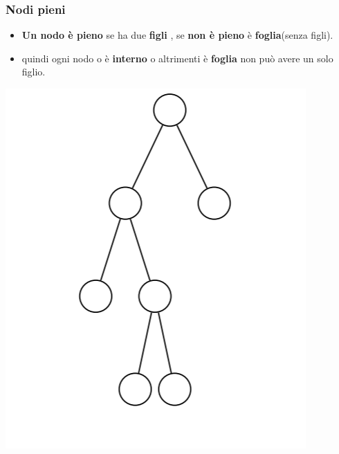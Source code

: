 \subsubsection{Nodi pieni}
\begin{itemize}
    \item   \textbf{Un nodo è pieno} se ha due \textbf{figli} , se \textbf{non è pieno} è \textbf{foglia}(senza figli).
    \item  quindi ogni nodo o è \textbf{interno} o altrimenti è \textbf{foglia} non può avere un solo figlio.
\end{itemize}
\begin{center}
    \includegraphics[scale = 0.3]{Capitoli/Alberi Binari/Esempi/NodiPieni.png}
\end{center}

